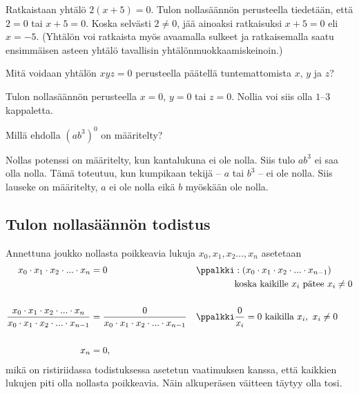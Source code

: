 \begin{esimerkki} Ratkaistaan yhtälö $2(x+5)=0$. Tulon nollasäännön perusteella tiedetään, että $2=0$ tai $x+5=0$. Koska selvästi $2\neq 0$, jää ainoaksi ratkaisuksi $x+5=0$ eli $x=-5$. (Yhtälön voi ratkaista myös avaamalla sulkeet ja ratkaisemalla saatu ensimmäisen asteen yhtälö tavallisin yhtälönmuokkaamiskeinoin.)
\end{esimerkki}

\begin{esimerkki} Mitä voidaan yhtälön $xyz=0$ perusteella päätellä tuntemattomista $x$, $y$ ja $z$?
	\begin{esimratk}
Tulon nollasäännön perusteella $x=0$, $y=0$ tai $z=0$. Nollia voi siis olla $1$--$3$ kappaletta.
	\end{esimratk}
\end{esimerkki}

\begin{esimerkki}
Millä ehdolla $(ab^3)^0$ on määritelty?
	\begin{esimratk}
	Nollas potenssi on määritelty, kun kantalukuna ei ole nolla. Siis tulo $ab^3$ ei saa olla nolla. Tämä toteutuu, kun kumpikaan tekijä -- $a$ tai $b^3$ -- ei ole nolla. Siis lauseke on määritelty, $a$ ei ole nolla eikä $b$ myöskään ole nolla.
	\end{esimratk}
\end{esimerkki}

\subsection*{\star Tulon nollasäännön todistus}

\begin{todistus}
Annettuna joukko nollasta poikkeavia lukuja $x_0, x_1, x_2 ... , x_n$ asetetaan
\begin{align*}
    x_0 \cdot x_1 \cdot x_2 \cdot ... \cdot x_n &= 0 & \ppalkki & : (x_0 \cdot x_1 \cdot x_2 \cdot ... \cdot x_{n-1}) \\
    & & & \text{koska kaikille $x_i$ pätee $x_i \neq 0$} \\
    \\
    \frac{x_0 \cdot x_1 \cdot x_2 \cdot ... \cdot x_n}{x_0 \cdot x_1 \cdot x_2 \cdot ... \cdot x_{n-1}} &=
    \frac{0}{x_0 \cdot x_1 \cdot x_2 \cdot ... \cdot x_{n-1}} & \ppalkki & \frac{0}{x_i} = 0\ \text{kaikilla $x_i,\ x_i \neq 0$} \\
    \\
    x_n &= 0, & &
\end{align*}
mikä on ristiriidassa todistuksessa asetetun vaatimuksen kanssa, että kaikkien lukujen piti olla nollasta poikkeavia. Näin alkuperäsen väitteen täytyy olla tosi.
\end{todistus}